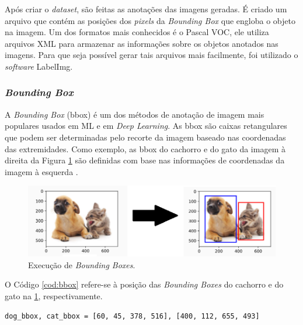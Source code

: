 Após criar o \textit{dataset}, são feitas as anotações das imagens geradas. É criado um arquivo que contém as posições dos \textit{pixels} da \textit{Bounding Box} que engloba o objeto na imagem. Um dos formatos mais conhecidos é o Pascal VOC, ele utiliza arquivos XML para armazenar as informações sobre os objetos anotados nas imagens. Para que seja possível gerar tais arquivos mais facilmente, foi utilizado o \textit{software} LabelImg.


\subsubsection*{\textit{Bounding Box}}

A \textit{Bounding Box} (bbox) é um dos métodos de anotação de imagem mais populares usados em ML e em \textit{Deep Learning}. As bbox são caixas retangulares que podem ser determinadas pelo recorte da imagem baseado nas coordenadas das extremidades. Como exemplo, as bbox do cachorro e do gato da imagem à direita da Figura \ref{fig:boundingBox} são definidas com base nas informações de coordenadas da imagem à esquerda \cite{allDeep}.

\begin{figure}[H]
		\centering
		\includegraphics[scale=0.6]{figuras/MachineLearning/catDog.png}
		\caption{Execução de \textit{Bounding Boxes}.}
		\label{fig:boundingBox}
\end{figure}

O Código \ref{cod:bbox} refere-se à posição das \textit{Bounding Boxes} do cachorro e do gato na \ref{fig:boundingBox}, respectivamente.

\begin{lstlisting}[caption=Posições de X e Y nas \textit{Bounding Boxes}, label=cod:bbox]
         dog_bbox, cat_bbox = [60, 45, 378, 516], [400, 112, 655, 493]
\end{lstlisting}


